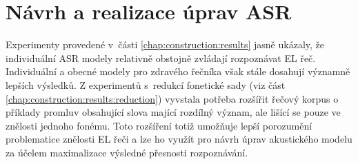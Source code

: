 \chapter{Návrh a realizace úprav ASR}
\label{chap:realisation}

Experimenty provedené v~části \ref{chap:construction:results} jasně ukázaly, že individuální ASR modely relativně obstojně zvládají rozpoznávat EL řeč.
Individuální a obecné modely pro zdravého řečníka však stále dosahují významně lepších výsledků.
Z experimentů s~redukcí fonetické sady (viz část \ref{chap:construction:results:reduction}) vyvstala potřeba rozšířit řečový korpus o příklady promluv obsahující slova mající rozdílný význam, ale lišící se pouze ve znělosti jednoho fonému.
Toto rozšíření totiž umožňuje lepší porozumění problematice znělosti EL řeči a lze ho využít pro návrh úprav akustického modelu za účelem maximalizace výsledné přesnosti rozpoznávání.










